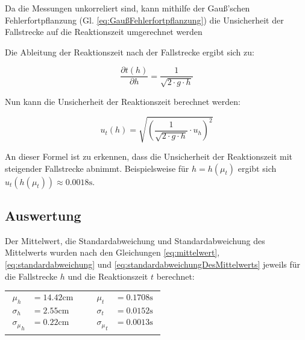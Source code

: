 \documentclass[a4paper,12pt]{article}
\begin{document}
\newpage

Da die Messungen unkorreliert sind, kann mithilfe der Gauß'schen Fehlerfortpflanzung
(Gl. \ref{eq:GaußFehlerfortpflanzung}) die Unsicherheit der Fallstrecke auf die Reaktionszeit umgerechnet werden

Die Ableitung der Reaktionszeit nach der Fallstrecke ergibt sich zu:

\begin{equation}
    \frac{\partial t(h)}{\partial h} = \frac{1}{\sqrt{2 \cdot g \cdot h}}
\end{equation}

Nun kann die Unsicherheit der Reaktionszeit berechnet werden:

\begin{equation}
    u_t(h) = \sqrt{\left(\frac{1}{\sqrt{2 \cdot g \cdot h}} \cdot u_h\right)^2}
\end{equation}

An dieser Formel ist zu erkennen, dass die Unsicherheit der Reaktionszeit mit steigender Fallstrecke abnimmt.
Beispielsweise für $h=h(\mu_t)$ ergibt sich $u_t(h(\mu_t)) \approx 0.0018\mathrm{s}$.


\subsection{Auswertung}

Der Mittelwert, die Standardabweichung und Standardabweichung des Mittelwerts wurden nach den
Gleichungen \ref{eq:mittelwert}, \ref{eq:standardabweichung} und \ref{eq:standardabweichungDesMittelwerts}
jeweils für die Fallstrecke $h$ und die Reaktionszeit $t$ berechnet:

\begin{table}[H]
    \centering
    \begin{tabular}{c c c}
        \parbox{4cm}{
            \begin{align*}
                \mu_h &= 14.42\mathrm{cm} \\
                \sigma_h &= 2.55\mathrm{cm} \\
                {\sigma_\mu}_h &= 0.22\mathrm{cm}
            \end{align*}
        } & \hspace{1cm} & \parbox{4cm}{
            \begin{align*}
                \mu_t &= 0.1708\mathrm{s} \\
                \sigma_t &= 0.0152\mathrm{s} \\
                {\sigma_\mu}_t &= 0.0013\mathrm{s}
            \end{align*}
        } \\
    \end{tabular}
\end{table}
\end{document}
